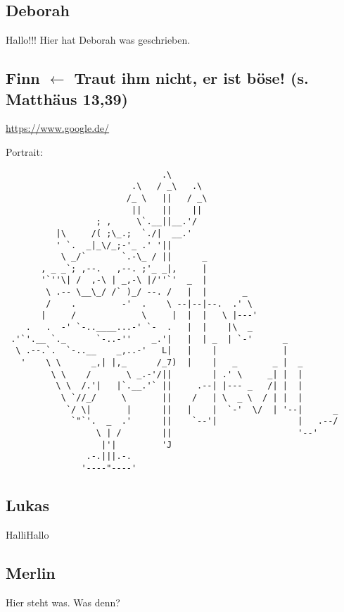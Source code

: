 \documentclass[12pt]{scrartcl}
\begin{document}
\subsection{Deborah}
Hallo!!! Hier hat Deborah was geschrieben.

\newpage
\subsection{Finn $\leftarrow$ Traut ihm nicht, er ist böse! (s. Matthäus 13,39)}
\url{https://www.google.de/}

Portrait:
\begin{verbatim}
                               .\
                         .\   / _\   .\
                        /_ \   ||   / _\
                         ||    ||    ||
                  ; ,     \`.__||__.'/
          |\     /( ;\_.;  `./|  __.'
          ' `.  _|_\/_;-'_ .' '||
           \ _/`       `.-\_ / ||      _
       , _ _`; ,--.   ,--. ;'_ _|,     |
       '`''\| /  ,-\ | _,-\ |/''`'  _  |
        \ .-- \__\_/ /` )_/ --. /   |  |       _
        /    .         -'  .    \ --|--|--.  .' \
       |     /             \     |  |  |   \ |---'
    .   .  -' `-..____...-' `-  .   |  |    |\  _
 .'`'.__ `._      `-..-''    _.'|   |  | _  | `-'      _
  \ .--.`.  `-..__    _,..-'   L|   |    |             |
   '    \ \      _,| |,_      /_7)  |    |   _       _ |  _
         \ \    /       \ _.-'/||        | .' \     _| |  |
          \ \  /.'|   |`.__.'` ||     .--| |--- _   /| |  |
           \ `//_/     \       ||    /   | \  _ \  / | |  |
            `/ \|       |      ||   |    |  `-'  \/  | '--|      _
             `"`'.  _  .'      ||    `--'|                |   .--/
                  \ | /        ||                         '--'
                   |'|         'J
                .-.|||.-.
               '----"----' 
\end{verbatim}
\subsection{Lukas}
HalliHallo


\subsection{Merlin}
Hier steht was.
Was denn?
\end{document}

